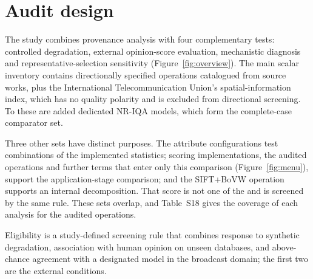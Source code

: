 \section{Audit design}\label{sec:method}


The study combines provenance analysis with four complementary tests: controlled degradation, external opinion-score evaluation, mechanistic diagnosis and representative-selection sensitivity (Figure~\ref{fig:overview}). The main scalar inventory contains \fontesDaLiteratura{} directionally specified operations catalogued from \fontesTrabalhos{} source works, plus the International Telecommunication Union's spatial-information index, which has no quality polarity and is excluded from directional screening. To these are added \invModelos{} dedicated NR-IQA models, which form the complete-case comparator set.

Three other sets have distinct purposes. The \resCombinacoes{} attribute configurations test combinations of the implemented statistics; \disOps{} scoring implementations, the \jusAuditadas{} audited operations and \jusSoJusante{} further terms that enter only this comparison (Figure~\ref{fig:menu}), support the application-stage comparison; and the SIFT+BoVW operation supports an internal decomposition. That score is not one of the \fontesOperacoes{} and is screened by the same rule. These sets overlap, and Table~S18 gives the coverage of each analysis for the \fontesOperacoes{} audited operations.

Eligibility is a study-defined screening rule that combines response to synthetic degradation, association with human opinion on unseen databases, and above-chance agreement with a designated model in the broadcast domain; the first two are the external conditions.

